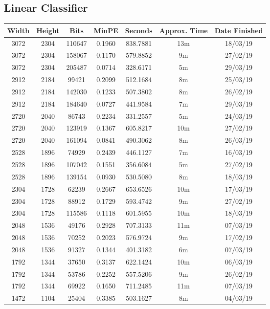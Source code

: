 \subsection{Linear Classifier}
  \begin{center}
  \begin{tabular}{ c c c | c | c c c }
  Width & Height & Bits & MinPE & Seconds & Approx. Time & Date Finished \\ \hline
  3072 & 2304 & 110647 & 0.1960 & 838.7881 & 13m & 18/03/19 \\
  3072 & 2304 & 158067 & 0.1170 & 579.8852 & 9m & 27/02/19 \\
  3072 & 2304 & 205487 & 0.0714 & 328.6171 & 5m & 29/03/19 \\
  2912 & 2184 & 99421 & 0.2099 & 512.1684 & 8m & 25/03/19 \\
  2912 & 2184 & 142030 & 0.1233 & 507.3802 & 8m & 26/02/19 \\
  2912 & 2184 & 184640 & 0.0727 & 441.9584 & 7m & 29/03/19 \\
  2720 & 2040 & 86743 & 0.2234 & 331.2557 & 5m & 24/03/19 \\
  2720 & 2040 & 123919 & 0.1367 & 605.8217 & 10m & 27/02/19 \\
  2720 & 2040 & 161094 & 0.0841 & 490.3062 & 8m & 26/03/19 \\
  2528 & 1896 & 74929 & 0.2439 & 446.1127 & 7m & 16/03/19 \\
  2528 & 1896 & 107042 & 0.1551 & 356.6084 & 5m & 27/02/19 \\
  2528 & 1896 & 139154 & 0.0930 & 530.5080 & 8m & 18/03/19 \\
  2304 & 1728 & 62239 & 0.2667 & 653.6526 & 10m & 17/03/19 \\
  2304 & 1728 & 88912 & 0.1729 & 593.4742 & 9m & 27/02/19 \\
  2304 & 1728 & 115586 & 0.1118 & 601.5955 & 10m & 18/03/19 \\
  2048 & 1536 & 49176 & 0.2928 & 707.3133 & 11m & 07/03/19 \\
  2048 & 1536 & 70252 & 0.2023 & 576.9724 & 9m & 17/02/19 \\
  2048 & 1536 & 91327 & 0.1344 & 401.3182 & 6m & 07/03/19 \\
  1792 & 1344 & 37650 & 0.3137 & 622.1424 & 10m & 06/03/19 \\
  1792 & 1344 & 53786 & 0.2252 & 557.5206 & 9m & 26/02/19 \\
  1792 & 1344 & 69922 & 0.1650 & 711.2485 & 11m & 07/03/19 \\
  1472 & 1104 & 25404 & 0.3385 & 503.1627 & 8m & 04/03/19 \\

\end{tabular}
\end{center}
